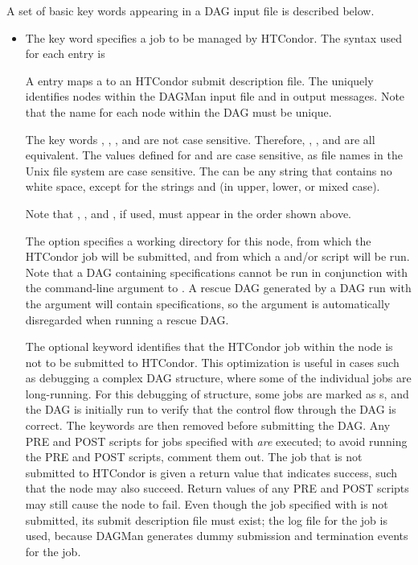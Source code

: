 A set of basic key words appearing in a DAG input file is described below.

\begin{itemize}

\label{dagman:JOB}
\item {}

The  key word specifies a job to be managed by HTCondor.
The syntax used for each  entry is

  
  

A  entry maps a  to an HTCondor submit description file.
The  uniquely identifies nodes within the
DAGMan input file and in output messages.
Note that the name for each node within the DAG
must be unique.

The key words , , , and 
are not case sensitive.
Therefore, , , and  are all equivalent.
The values defined for  and 
are case sensitive, as file names in
the Unix file system are case sensitive.
The  can be any string that contains no white space, except
for the strings  and  (in upper, lower, or mixed
case).

Note that , , and , if used, must appear
in the order shown above.

The  option specifies a working directory
for this node,
from which the HTCondor job will be submitted,
and from which a  and/or
 script will be run.
Note that a DAG containing  specifications cannot
be run in conjunction with the  command-line
argument to .  A rescue DAG generated by
a DAG run with the  argument will contain
 specifications, so the  argument is
automatically disregarded when running a rescue DAG.

\label{dagman:NOOP}
The optional  keyword identifies that the HTCondor job within
the node is not to be submitted to HTCondor.
This optimization is useful in cases such as debugging a complex DAG structure,
where some of the individual jobs are long-running.
For this debugging of structure,
some jobs are marked as s, and
the DAG is initially run to verify that the control flow through
the DAG is correct.
The  keywords are then removed before submitting the DAG.
Any PRE and POST scripts
for jobs specified with  \emph{are} executed;
to avoid running the PRE and POST scripts, comment them out.
The job that is not submitted to HTCondor is given a return value that indicates
success, such that the node may also succeed.
Return values of any 
PRE and POST scripts may still cause the node to fail.
Even though the job specified with  is not submitted,
its submit description file must exist;
the log file for the job is used, 
because DAGMan generates dummy submission and termination events for the job.


\end{itemize}
